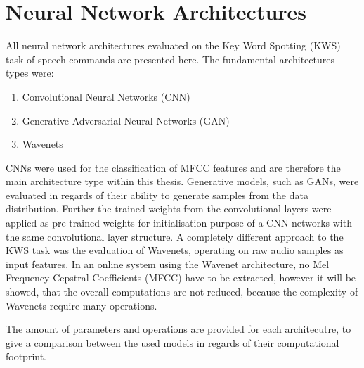 
\section{Neural Network Architectures}\label{sec:nn_arch}
\thesisStateNotReady
All neural network architectures evaluated on the Key Word Spotting (KWS) task of speech commands are presented here.
The fundamental architectures types were:
\begin{enumerate}
	\item Convolutional Neural Networks (CNN)
	\item Generative Adversarial Neural Networks (GAN)
	\item Wavenets
\end{enumerate}
CNNs were used for the classification of MFCC features and are therefore the main architecture type within this thesis.
Generative models, such as GANs, were evaluated in regards of their ability to generate samples from the data distribution.
Further the trained weights from the convolutional layers were applied as pre-trained weights for initialisation purpose of a CNN networks with the same convolutional layer structure.
A completely different approach to the KWS task was the evaluation of Wavenets, operating on raw audio samples as input features.
In an online system using the Wavenet architecture, no Mel Frequency Cepstral Coefficients (MFCC) have to be extracted, however it will be showed, that the overall computations are not reduced, because the complexity of Wavenets require many operations.

The amount of parameters and operations are provided for each architecutre, to give a comparison between the used models in regards of their computational footprint.



